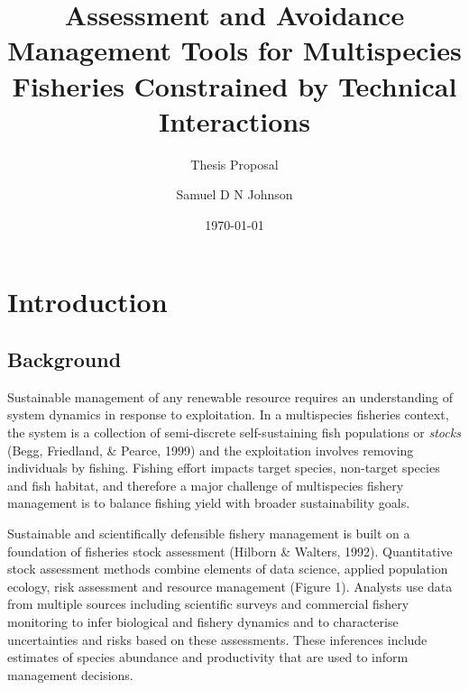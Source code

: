 \documentclass[12pt,]{scrartcl}
\title{Assessment and Avoidance Management Tools for Multispecies Fisheries
Constrained by Technical Interactions}
\subtitle{Thesis Proposal}
\author{Samuel D N Johnson}
\date{\today}
\begin{document}
\maketitle

\linenumbers





\newpage

{
\hypersetup{linkcolor=black}
\setcounter{tocdepth}{3}
\tableofcontents
}
\section{Introduction}\label{introduction}

\subsection{Background}\label{background}

Sustainable management of any renewable resource requires an
understanding of system dynamics in response to exploitation. In a
multispecies fisheries context, the system is a collection of
semi-discrete self-sustaining fish populations or \emph{stocks} (Begg,
Friedland, \& Pearce, 1999) and the exploitation involves removing
individuals by fishing. Fishing effort impacts target species,
non-target species and fish habitat, and therefore a major challenge of
multispecies fishery management is to balance fishing yield with broader
sustainability goals.

Sustainable and scientifically defensible fishery management is built on
a foundation of fisheries stock assessment (Hilborn \& Walters, 1992).
Quantitative stock assessment methods combine elements of data science,
applied population ecology, risk assessment and resource management
(Figure 1). Analysts use data from multiple sources including scientific
surveys and commercial fishery monitoring to infer biological and
fishery dynamics and to characterise uncertainties and risks based on
these assessments. These inferences include estimates of species
abundance and productivity that are used to inform management decisions.
\end{document}
